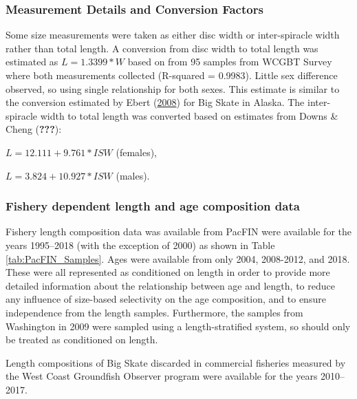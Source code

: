 \documentclass[12pt,]{article}
\begin{document}
\hypertarget{measurement-details-and-conversion-factors}{%
\subsubsection{Measurement Details and Conversion
Factors}\label{measurement-details-and-conversion-factors}}

Some size measurements were taken as either disc width or inter-spiracle
width rather than total length. A conversion from disc width to total
length was estimated as \(L = 1.3399 * W\) based on from 95 samples from
WCGBT Survey where both measurements collected (R-squared = 0.9983).
Little sex difference observed, so using single relationship for both
sexes. This estimate is similar to the conversion estimated by Ebert
(\protect\hyperlink{ref-Ebert2008}{2008}) for Big Skate in Alaska. The
inter-spiracle width to total length was converted based on estimates
from Downs \& Cheng ({\textbf{???}}):

\begin{centering}

$L = 12.111 + 9.761*ISW$ (females),

$L = 3.824 + 10.927*ISW$ (males).

\end{centering}

\hypertarget{fishery-dependent-length-and-age-composition-data}{%
\subsubsection{Fishery dependent length and age composition
data}\label{fishery-dependent-length-and-age-composition-data}}

Fishery length composition data was available from PacFIN were available
for the years 1995--2018 (with the exception of 2000) as shown in Table
\ref{tab:PacFIN_Samples}. Ages were available from only 2004, 2008-2012,
and 2018. These were all represented as conditioned on length in order
to provide more detailed information about the relationship between age
and length, to reduce any influence of size-based selectivity on the age
composition, and to ensure independence from the length samples.
Furthermore, the samples from Washington in 2009 were sampled using a
length-stratified system, so should only be treated as conditioned on
length.

Length compositions of Big Skate discarded in commercial fisheries
measured by the West Coast Groundfish Observer program were available
for the years 2010--2017.
\end{document}
